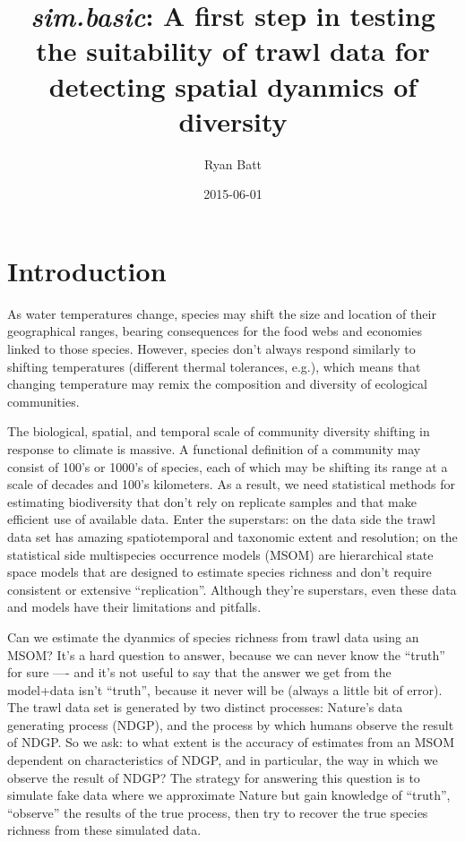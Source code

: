 \documentclass{article}\usepackage[]{graphicx}\usepackage[]{color}
\begin{document}



\title{\textbf{\emph{sim.basic}: A first step in testing the suitability of trawl data for detecting spatial dyanmics of diversity}}
\author{Ryan Batt}
\date{2015-06-01}
\maketitle



\section{Introduction}

As water temperatures change, species may shift the size and location of their geographical ranges, bearing consequences for the food webs and economies linked to those species. However, species don't always respond similarly to shifting temperatures (different thermal tolerances, e.g.), which means that changing temperature may remix the composition and diversity of ecological communities.

\par
The biological, spatial, and temporal scale of community diversity shifting in response to climate is massive. A functional definition of a community may consist of 100's or 1000's of species, each of which may be shifting its range at a scale of decades and 100's kilometers. As a result, we need statistical methods for estimating biodiversity that don't rely on replicate samples and that make efficient use of available data. Enter the superstars: on the data side the trawl data set has amazing spatiotemporal and taxonomic extent and resolution; on the statistical side multispecies occurrence models (MSOM) are hierarchical state space models that are designed to estimate species richness and don't require consistent or extensive ``replication''. Although they're superstars, even these data and models have their limitations and pitfalls.

\par
Can we estimate the dyanmics of species richness from trawl data using an MSOM? It's a hard question to answer, because we can never know the ``truth'' for sure ---- and it's not useful to say that the answer we get from the model+data isn't ``truth'', because it never will be (always a little bit of error). The trawl data set is generated by two distinct processes: Nature's data generating process (NDGP), and the process by which humans observe the result of NDGP. So we ask: to what extent is the accuracy of estimates from an MSOM dependent on characteristics of NDGP, and in particular, the way in which we observe the result of NDGP? The strategy for answering this question is to simulate fake data where we approximate Nature but gain knowledge of ``truth'', ``observe'' the results of the true process, then try to recover the true species richness from these simulated data.
\end{document}
